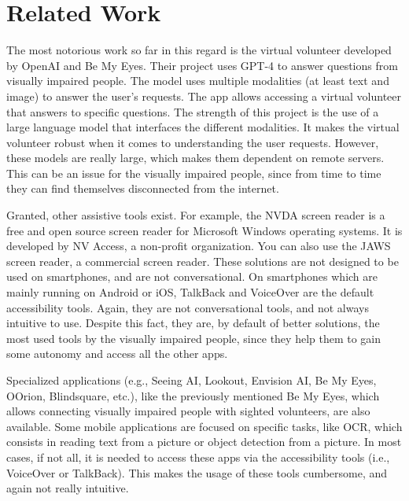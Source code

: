 \documentclass[sigconf]{acmart}
\begin{document}
\section{Related Work}
The most notorious work so far in this regard is the virtual volunteer developed by OpenAI and Be My Eyes\cite{IntroducingOurVirtual2023}. Their project uses GPT-4\cite{GPT42023} to answer questions from visually impaired people. The model uses multiple modalities (at least text and image) to answer the user's requests. The app allows accessing a virtual volunteer that answers to specific questions. The strength of this project is the use of a large language model that interfaces the different modalities. It makes the virtual volunteer robust when it comes to understanding the user requests. However, these models are really large, which makes them dependent on remote servers. This can be an issue for the visually impaired people, since from time to time they can find themselves disconnected from the internet.

Granted, other assistive tools exist. For example, the NVDA screen reader\cite{NVAccess2017} is a free and open source screen reader for Microsoft Windows operating systems. It is developed by NV Access, a non-profit organization. You can also use the JAWS\cite{JAWSLogicielLecture} screen reader, a commercial screen reader. These solutions are not designed to be used on smartphones, and are not conversational. On smartphones which are mainly running on Android or iOS, TalkBack and VoiceOver are the default accessibility tools. Again, they are not conversational tools, and not always intuitive to use. Despite this fact, they are, by default of better solutions, the most used tools by the visually impaired people, since they help them to gain some autonomy and access all the other apps.

Specialized applications (e.g., Seeing AI\cite{SeeingAIApp2022}, Lookout\cite{LookoutVisionAssistee2022}, Envision AI\cite{EnvisionApp2022}, Be My Eyes\cite{kaurBeMyEyes2017}, OOrion\cite{OOrion2023}, Blindsquare\cite{mipsoftBlindSquare2023}, etc.), like the previously mentioned Be My Eyes, which allows connecting visually impaired people with sighted volunteers, are also available. Some mobile applications are focused on specific tasks, like OCR, which consists in reading text from a picture or object detection from a picture. In most cases, if not all, it is needed to access these apps via the accessibility tools (i.e., VoiceOver or TalkBack). This makes the usage of these tools cumbersome, and again not really intuitive.
\end{document}
